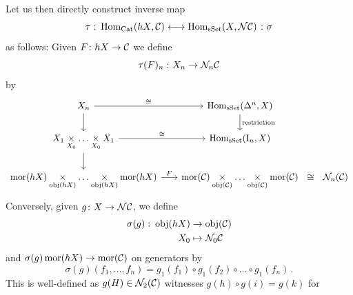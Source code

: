         Let us then directly construct inverse map
        \begin{equation*}
            \tau \,\colon \operatorname{Hom}_{\operatorname{Cat}}(hX, \mathcal{C}) \longleftrightarrow \operatorname{Hom}_{\operatorname{sSet}}(X, \mathcal{N}\mathcal{C}) \;\colon \sigma
        \end{equation*}
        as follows: Given $F \colon hX \to \mathcal{C}$ we define
        \begin{equation*}
            \tau(F)_n \,\colon X_n \to \mathcal{N}_n\mathcal{C}
        \end{equation*}
        by
        \begin{equation*}
            \begin{tikzcd}[column sep=scriptsize]
                X_n \arrow[r, "\cong"] \arrow[d] & \Hom_{\sSet}(\Delta^n, X) \arrow[d, "\text{restriction}"] & \\
                \longpb{X_1}{X_0} \arrow[r, "\cong"] \arrow[d] & \Hom_{\sSet}(\II_n, X) & \\
                \longpb{\mor(hX)}{\obj(hX)} \arrow[r, "F"] & \longpb{\mor(\Cc)}{\obj(\Cc)} \arrow[r, phantom, "\cong"] & \Nn_n(\Cc)
            \end{tikzcd}
        \end{equation*}
        Conversely, given $g \colon X \to \mathcal{N}\mathcal{C}$, we define
        \begin{align*}
            \sigma(g) \,\colon \operatorname{obj}(hX) &\to \operatorname{obj}(\mathcal{C}) \\
            X_0 &\mapsto \mathcal{N}_0 \mathcal{C}
        \end{align*}
        and $\sigma(g) \operatorname{mor}(hX) \to \operatorname{mor}(\mathcal{C})$ on generators by
        \begin{equation*}
            \sigma(g)(f_1, \ldots, f_n) = g_1(f_1) \circ g_1(f_2) \circ \ldots \circ g_1(f_n) \,.
        \end{equation*}
        This is well-defined as $g(H) \in \mathcal{N}_2(\mathcal{C})$ witnesses $g(h) \circ g(i) = g(k)$ for

